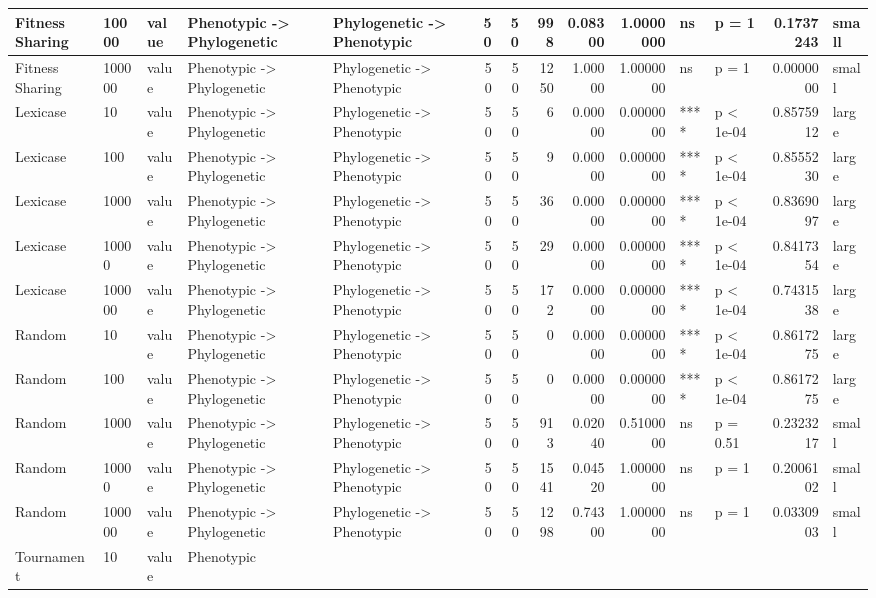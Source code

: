 \documentclass[]{book}
\begin{document}
\begin{table}
\begin{tabular}[t]{l|l|l|l|l|r|r|r|r|r|l|l|r|l}
\hline
Fitness Sharing & 10000 & value & Phenotypic
    ->
Phylogenetic & Phylogenetic
    ->
Phenotypic & 50 & 50 & 998 & 0.08300 & 1.0000000 & ns & p = 1 & 0.1737243 & small\\
\hline
Fitness Sharing & 100000 & value & Phenotypic
    ->
Phylogenetic & Phylogenetic
    ->
Phenotypic & 50 & 50 & 1250 & 1.00000 & 1.0000000 & ns & p = 1 & 0.0000000 & small\\
\hline
Lexicase & 10 & value & Phenotypic
    ->
Phylogenetic & Phylogenetic
    ->
Phenotypic & 50 & 50 & 6 & 0.00000 & 0.0000000 & **** & p < 1e-04 & 0.8575912 & large\\
\hline
Lexicase & 100 & value & Phenotypic
    ->
Phylogenetic & Phylogenetic
    ->
Phenotypic & 50 & 50 & 9 & 0.00000 & 0.0000000 & **** & p < 1e-04 & 0.8555230 & large\\
\hline
Lexicase & 1000 & value & Phenotypic
    ->
Phylogenetic & Phylogenetic
    ->
Phenotypic & 50 & 50 & 36 & 0.00000 & 0.0000000 & **** & p < 1e-04 & 0.8369097 & large\\
\hline
Lexicase & 10000 & value & Phenotypic
    ->
Phylogenetic & Phylogenetic
    ->
Phenotypic & 50 & 50 & 29 & 0.00000 & 0.0000000 & **** & p < 1e-04 & 0.8417354 & large\\
\hline
Lexicase & 100000 & value & Phenotypic
    ->
Phylogenetic & Phylogenetic
    ->
Phenotypic & 50 & 50 & 172 & 0.00000 & 0.0000000 & **** & p < 1e-04 & 0.7431538 & large\\
\hline
Random & 10 & value & Phenotypic
    ->
Phylogenetic & Phylogenetic
    ->
Phenotypic & 50 & 50 & 0 & 0.00000 & 0.0000000 & **** & p < 1e-04 & 0.8617275 & large\\
\hline
Random & 100 & value & Phenotypic
    ->
Phylogenetic & Phylogenetic
    ->
Phenotypic & 50 & 50 & 0 & 0.00000 & 0.0000000 & **** & p < 1e-04 & 0.8617275 & large\\
\hline
Random & 1000 & value & Phenotypic
    ->
Phylogenetic & Phylogenetic
    ->
Phenotypic & 50 & 50 & 913 & 0.02040 & 0.5100000 & ns & p = 0.51 & 0.2323217 & small\\
\hline
Random & 10000 & value & Phenotypic
    ->
Phylogenetic & Phylogenetic
    ->
Phenotypic & 50 & 50 & 1541 & 0.04520 & 1.0000000 & ns & p = 1 & 0.2006102 & small\\
\hline
Random & 100000 & value & Phenotypic
    ->
Phylogenetic & Phylogenetic
    ->
Phenotypic & 50 & 50 & 1298 & 0.74300 & 1.0000000 & ns & p = 1 & 0.0330903 & small\\
\hline
Tournament & 10 & value & Phenotypic

\end{tabular}
\end{table}
\end{document}

